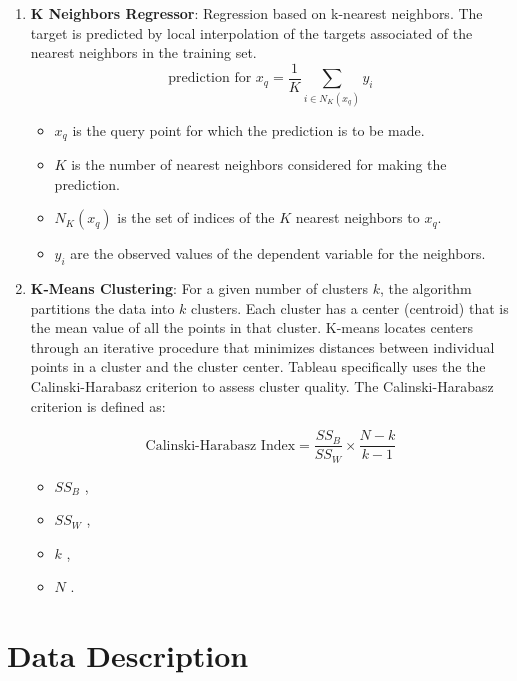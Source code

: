 \documentclass{article}
\theoremstyle{mytheoremstyle}
\theoremstyle{mytheoremstyle}
\theoremstyle{myproblemstyle}
\begin{document}
\begin{enumerate}
    \item \textbf{K Neighbors Regressor}: Regression based on k-nearest neighbors. The target is predicted by local interpolation of the targets associated of the nearest neighbors in the training set.
        \[
\text{prediction for } x_q = \frac{1}{K} \sum_{i \in N_K(x_q)} y_i
\]
\begin{itemize}
    \item $x_q$ is the query point for which the prediction is to be made.
    \item $K$ is the number of nearest neighbors considered for making the prediction.
    \item $N_K(x_q)$ is the set of indices of the $K$ nearest neighbors to $x_q$.
    \item $y_i$ are the observed values of the dependent variable for the neighbors.
\end{itemize}

    \item \textbf{K-Means Clustering}: For a given number of clusters $k$, the algorithm partitions the data into $k$ clusters. Each cluster has a center (centroid) that is the mean value of all the points in that cluster. K-means locates centers through an iterative procedure that minimizes distances between individual points in a cluster and the cluster center. Tableau specifically uses the the Calinski-Harabasz criterion to assess cluster quality. The Calinski-Harabasz criterion is defined as:
    
\[
\text{Calinski-Harabasz Index} = \frac{SS_B}{SS_W} \times \frac{N-k}{k-1}
\]

\begin{itemize}
    \item $SS_B$ , 
    \item $SS_W$ , 
    \item $k$ , 
    \item $N$ .
\end{itemize}


\end{enumerate}



\pagebreak
\section{Data Description}
\end{document}
